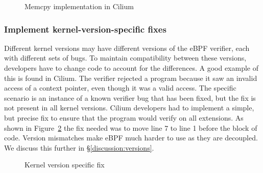 \begin{figure}
    
    \vspace{-10pt}
    \caption{Memcpy implementation in Cilium}
    \vspace{-10pt}
    \label{fig:cilium-memcpy}
\end{figure}

\subsubsection{Implement kernel-version-specific fixes}
\label{motivation:kernel-version}
Different kernel versions may have different versions of the eBPF verifier, each with different sets of bugs.
To maintain compatibility between these versions, developers have to change code to account for the differences.
A good example of this is found in Cilium.
The verifier rejected a program because it saw an invalid access of a context pointer, even though
    it was a valid access.
The specific scenario is an instance of a known verifier bug that has been fixed, but the fix is not present in all kernel versions.
Cilium developers had to implement a simple, but precise fix to ensure that the program would verify on all extensions.
As shown in Figure~\ref{fig:kernel-version-code} the fix needed was to move line 7 to line 1 before the block of code.
Version mismatches make eBPF much harder to use as they are decoupled.
We discuss this further in \S\ref{discussion:versions}.


\begin{figure}
    
    \vspace{-10pt}
    \caption{Kernel version specific fix}
    \vspace{-5pt}
    \label{fig:kernel-version-code}
\end{figure}

